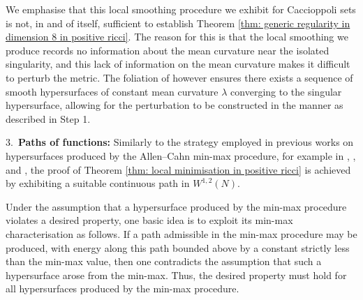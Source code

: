 \documentclass[11pt]{article}
\begin{document}
\bigskip

We emphasise that this local smoothing procedure we exhibit for Caccioppoli sets is not, in and of itself, sufficient to establish Theorem \ref{thm: generic regularity in dimension 8 in positive ricci}. The reason for this is that the local smoothing we produce records no information about the mean curvature near the isolated singularity, and this lack of information on the mean curvature makes it difficult to perturb the metric. The foliation of \cite{Kostas23} however ensures there exists a sequence of smooth hypersurfaces of constant mean curvature $\lambda$ converging to the singular hypersurface, allowing for the perturbation to be constructed in the manner as described in Step 1.

\bigskip

3.~\textbf{Paths of functions:} Similarly to the strategy employed in previous works on hypersurfaces produced by the Allen--Cahn min-max procedure, for example in \cite{bellettini}, \cite{bellettini-wickramasekera}, and \cite{Bellettini-Workman}, the proof of Theorem \ref{thm: local minimisation in positive ricci} is achieved by exhibiting a suitable continuous path in $W^{1,2}(N)$. 

\bigskip

Under the assumption that a hypersurface produced by the min-max procedure violates a desired property, one basic idea is to exploit its min-max characterisation as follows. If a path admissible in the min-max procedure may be produced, with energy along this path bounded above by a constant strictly less than the min-max value, then one contradicts the assumption that such a hypersurface arose from the min-max. Thus, the desired property must hold for all hypersurfaces produced by the min-max procedure.

\bigskip
\end{document}
